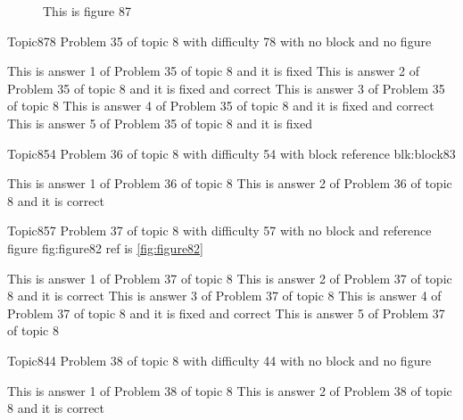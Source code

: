 \documentclass[master]{exam}
\begin{document}
\begin{figure}
	\begin{center}
		This is figure 87 
		\label{fig:figure87}
	\end{center}
\end{figure}

\begin{problem}{Topic8}{78}
	Problem 35 of topic 8 with difficulty 78 with no block and no figure
	\begin{answers}
		\answer[fixed] This is answer 1 of Problem 35 of topic 8 and it is fixed
		 This is answer 2 of Problem 35 of topic 8 and it is fixed and correct
		\answer This is answer 3 of Problem 35 of topic 8 
		 This is answer 4 of Problem 35 of topic 8 and it is fixed and correct
		\answer[fixed] This is answer 5 of Problem 35 of topic 8 and it is fixed
	\end{answers}
\end{problem}

\begin{problem}[requires=blk:block83]{Topic8}{54}
	Problem 36 of topic 8 with difficulty 54 with block reference blk:block83
	\begin{answers}
		\answer This is answer 1 of Problem 36 of topic 8 
		\answer[correct] This is answer 2 of Problem 36 of topic 8 and it is correct
	\end{answers}
\end{problem}

\begin{problem}{Topic8}{57}
	Problem 37 of topic 8 with difficulty 57 with no block and reference figure fig:figure82 ref is \ref{fig:figure82}
	\begin{answers}
		\answer This is answer 1 of Problem 37 of topic 8 
		\answer[correct] This is answer 2 of Problem 37 of topic 8 and it is correct
		\answer This is answer 3 of Problem 37 of topic 8 
		 This is answer 4 of Problem 37 of topic 8 and it is fixed and correct
		\answer This is answer 5 of Problem 37 of topic 8 
	\end{answers}
\end{problem}

\begin{problem}{Topic8}{44}
	Problem 38 of topic 8 with difficulty 44 with no block and no figure
	\begin{answers}
		\answer This is answer 1 of Problem 38 of topic 8 
		\answer[correct] This is answer 2 of Problem 38 of topic 8 and it is correct
	\end{answers}
\end{problem}
\end{document}

